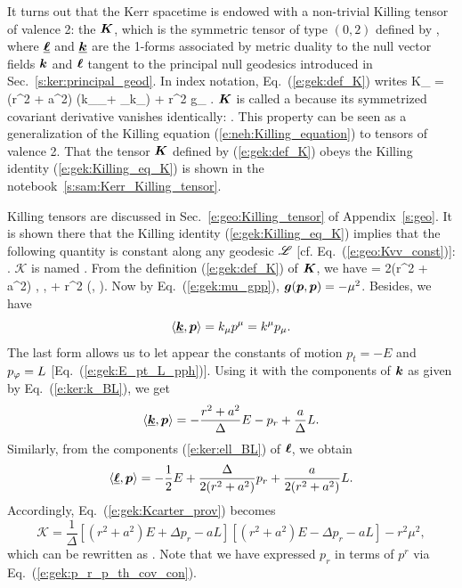 It turns out that the Kerr spacetime is endowed with a non-trivial
Killing tensor of valence 2: the
 $\bm{K}$, which is the symmetric tensor of type
$(0,2)$ defined by
\be \label{e:gek:def_K}
     ,
\ee
where $\underline{\bm{\ell}}$ and $\underline{\bm{k}}$ are the 1-forms associated by metric duality
to the null vector fields $\bm{k}$ and $\bm{\ell}$ tangent to the principal null
geodesics introduced in Sec.~\ref{s:ker:principal_geod}. In index notation,
Eq.~(\ref{e:gek:def_K}) writes
\be
    K_{\alpha\beta} = (r^2 + a^2) \left(k_\alpha \el_\beta + \el_\alpha k_\beta \right)
        + r^2 g_{\alpha\beta} .
\ee
$\bm{K}$ is called a  because its symmetrized covariant derivative vanishes identically:
\be \label{e:gek:Killing_eq_K}
    .
\ee
This property can be seen as a generalization of the Killing equation
(\ref{e:neh:Killing_equation}) to tensors of valence 2.
That the tensor $\bm{K}$ defined by (\ref{e:gek:def_K}) obeys the Killing
identity (\ref{e:gek:Killing_eq_K}) is shown in the notebook~\ref{s:sam:Kerr_Killing_tensor}.

Killing tensors are discussed in Sec.~\ref{e:geo:Killing_tensor} of Appendix~\ref{s:geo}.
It is shown there that the Killing identity (\ref{e:gek:Killing_eq_K}) implies that
the following quantity is constant along any geodesic $\mathscr{L}$ [cf. Eq.~(\ref{e:geo:Kvv_const})]:
\be
     .
\ee
$\mathscr{K}$ is named .
From the definition (\ref{e:gek:def_K}) of $\bm{K}$, we have
\be \label{e:gek:Kcarter_prov}
     = 2(r^2 + a^2) \langle {},  \rangle
        \langle \uu{\el},  \rangle + r^2 (, ).
\ee
Now by Eq.~(\ref{e:gek:mu_gpp}), $\bm{g}(\bm{p}, \bm{p}) = - \mu^2$. Besides, we
have
\[
  \langle \underline{\bm{k}}, \bm{p} \rangle = k_\mu p^\mu = k^\mu p_\mu .
\]
The last form allows us to let appear the constants of motion $p_t = -E$ and
$p_\varphi = L$ [Eq.~(\ref{e:gek:E_pt_L_pph})]. Using it with the components
of $\bm{k}$ as given by Eq.~(\ref{e:ker:k_BL}), we get
\[
    \langle \underline{\bm{k}}, \bm{p} \rangle = - \frac{r^2 + a^2}{\Delta} E
    - p_r + \frac{a}{\Delta} L .
\]
Similarly, from the components (\ref{e:ker:ell_BL}) of $\bm{\ell}$, we obtain
\[
     \langle \underline{\bm{\ell}}, \bm{p} \rangle = - \frac{1}{2} E + \frac{\Delta}{2(r^2 + a^2)} p_r
     + \frac{a}{2(r^2 + a^2)} L .
\]
Accordingly, Eq.~(\ref{e:gek:Kcarter_prov}) becomes
\[
    \mathscr{K} = \frac{1}{\Delta} \left[ (r^2 + a^2) E + \Delta p_r - a L \right]
      \left[ (r^2 + a^2) E - \Delta p_r - a L \right] - r^2 \mu^2 ,
\]
which can be rewritten as
\be \label{e:gek:Kcarter_first_int}
   .
\ee
Note that we have expressed $p_r$ in terms of $p^r$ via Eq.~(\ref{e:gek:p_r_p_th_cov_con}).

